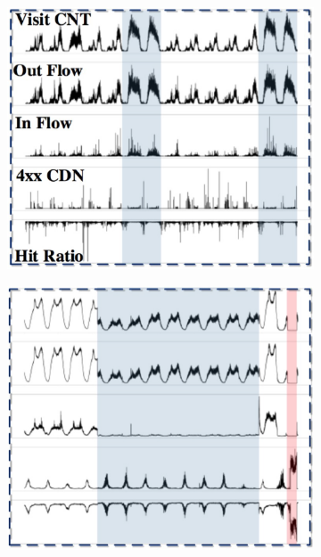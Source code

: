\documentclass[letterpaper,12pt]{article}
\begin{document}
	\begin{figure}[htbp] 
		\centering 
		
		\begin{subfigure}{0.2\textwidth}
			\includegraphics[width=\linewidth]{CDN_KPI/cdn_kpi_a}
			\captionsetup{font=scriptsize}
			\caption{}
			\label{fig: cdn_kpi_a}
		\end{subfigure}
		\begin{subfigure}{0.2\textwidth}
			\includegraphics[width=\linewidth]{CDN_KPI/cdn_kpi_b}

\end{subfigure}
\end{figure}
\end{document}
